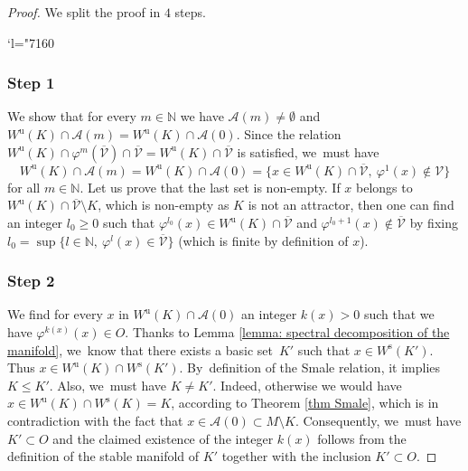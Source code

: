 \documentclass[JEP,XML,SOM,Unicode,NoEqCountersInSection,NoFloatCountersInSection,published]{cedram}
\newcommand{\Changel}{\mathcode`l="7160}
\newcommand{\rs}{\mathrm{s}}
\newcommand{\ru}{\mathrm{u}}
\theoremstyle{definition}
\theoremstyle{plain}
\newcommand{\Acal}{\mathcal{A}}
\newcommand{\N}{\mathbb{N}}
\newcommand{\Vcal}{\mathcal{V}}
\begin{document}
\begin{proof}We split the proof in $4$ steps.

\Changel
\subsubsection*{Step 1} We show that for every $m \in \N$ we have $\Acal(m) \neq \emptyset$ and $W^\ru (K) \cap \Acal(m) = W^\ru (K) \cap \Acal(0)$. Since the relation $W^\ru (K) \cap \varphi^{m} (\overline{\Vcal}) \cap \overline{\Vcal} = W^\ru (K) \cap \overline{\Vcal}$ is satisfied, we~must have
\[
W^\ru (K)\cap \Acal (m) = W^\ru (K) \cap \Acal (0) = \{ x \in W^\ru (K) \cap \overline{\Vcal}, \: \varphi^{1} (x) \notin \Vcal \}
\]
for all $m \in \N$. Let us prove that the last set is non-empty. If $x$ belongs to \hbox{$W^\ru (K) \cap \overline{\Vcal} \setminus K$}, which is non-empty as $K$ is not an attractor, then one can find an integer $l_0 \geq 0$ such that $\varphi^{l_0}(x) \in W^\ru (K) \cap \overline{\Vcal}$ and $\varphi^{l_0 + 1}(x) \notin \overline{\Vcal}$ by fixing $l_0 = \sup \{ l \in \N, \: \varphi^{l} (x) \in \overline{\Vcal} \}$ (which is finite by definition of $x$).

\subsubsection*{Step 2} We find for every $x$ in $W^\ru (K) \cap \Acal(0)$ an integer $k (x) > 0$ such that we have $\varphi^{k (x)}(x) \in O$. Thanks to Lemma \ref{lemma: spectral decomposition of the manifold}, we~know that there exists a basic set~$K'$ such that $x \in W^\rs (K')$. Thus $x \in W^\ru (K) \cap W^\rs (K')$. By~definition of the Smale relation, it implies $K \leq K'$. Also, we~must have $K \neq K'$. Indeed, otherwise we would have $x \in W^\ru (K) \cap W^\rs (K) = K$, according to Theorem \ref{thm Smale}, which is in contradiction with the fact that $x \in \Acal (0) \subset M\setminus K$. Consequently, we~must have $K' \subset O$ and the claimed existence of the integer $k (x)$ follows from the definition of the stable manifold of $K'$ together with the inclusion $K' \subset O$.


\end{proof}
\end{document}
